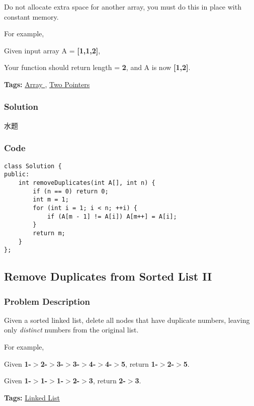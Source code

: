 \documentclass{article}
\begin{document}
\begin{CJK*}{UTF8}{gkai}
Do not allocate extra space for another array, you must do this in place with constant memory.

For example,


Given input array A = \textbf{[1,1,2]},

Your function should return length = \textbf{2}, and A is now \textbf{[1,2]}.


\textbf{Tags: }
\hyperref[ Array ]{ Array },  \hyperref[ Two Pointers ]{ Two Pointers }



\subsubsection*{Solution}
水题

\subsubsection*{Code}
\begin{lstlisting}
class Solution {
public:
    int removeDuplicates(int A[], int n) {
        if (n == 0) return 0;
        int m = 1;
        for (int i = 1; i < n; ++i) {
            if (A[m - 1] != A[i]) A[m++] = A[i];
        }
        return m;
    }
}; 
\end{lstlisting}


\subsection{ Remove Duplicates from Sorted List II }
\label{ Remove Duplicates from Sorted List II }

\subsubsection*{Problem Description}
Given a sorted linked list, delete all nodes that have duplicate numbers, leaving only \emph{distinct} numbers from the original list.

For example,


Given \textbf{1-$>$2-$>$3-$>$3-$>$4-$>$4-$>$5}, return \textbf{1-$>$2-$>$5}.


Given \textbf{1-$>$1-$>$1-$>$2-$>$3}, return \textbf{2-$>$3}.


\textbf{Tags: }
\hyperref[ Linked List ]{ Linked List }




\end{CJK*}
\end{document}
